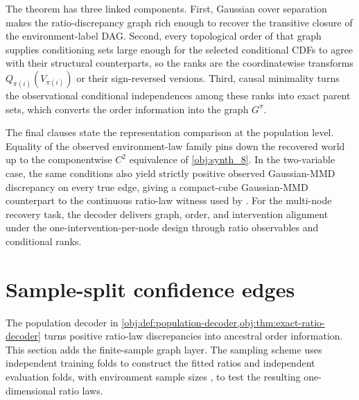\documentclass[11pt]{article}
\begin{document}
The theorem has three linked components. First, Gaussian cover separation makes the ratio-discrepancy graph rich enough to recover the transitive closure of the environment-label DAG. Second, every topological order of that graph supplies conditioning sets large enough for the selected conditional CDFs to agree with their structural counterparts, so the ranks are the coordinatewise transforms \(Q_{\pi(i)}(V_{\pi(i)})\) or their sign-reversed versions. Third, causal minimality turns the observational conditional independences among these ranks into exact parent sets, which converts the order information into the graph \(G^\pi\).

The final clauses state the representation comparison at the population level. Equality of the observed environment-law family pins down the recovered world up to the componentwise \(C^2\) equivalence of \cref{obj:synth_8}. In the two-variable case, the same conditions also yield strictly positive observed Gaussian-MMD discrepancy on every true edge, giving a compact-cube Gaussian-MMD counterpart to the continuous ratio-law witness used by \citet{vonKugelgenEtAl2023UnknownInterventions}. For the multi-node recovery task, the decoder delivers graph, order, and intervention alignment under the one-intervention-per-node design through ratio observables and conditional ranks.


\section{Sample-split confidence edges}\label{sec:confidence-edges}

The population decoder in \cref{obj:def:population-decoder,obj:thm:exact-ratio-decoder} turns positive ratio-law discrepancies into ancestral order information. This section adds the finite-sample graph layer. The sampling scheme uses independent training folds to construct the fitted ratios  and independent evaluation folds, with environment sample sizes , to test the resulting one-dimensional ratio laws.
\end{document}
